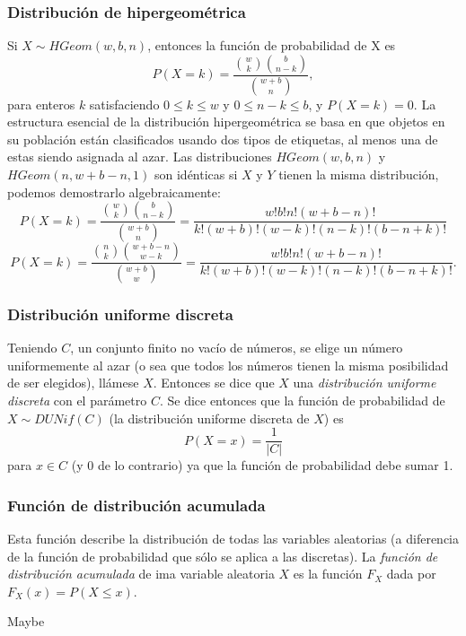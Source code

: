 \documentclass[12pt,letterpaper]{article}
\begin{document}
\subsubsection {Distribución de hipergeométrica}
Si $X \sim HGeom(w,b,n)$, entonces la función de probabilidad de X es
\begin{equation}
P(X=k)=\frac{\binom{w}{k}\binom{b}{n-k}}{\binom{w+b}{n}},
\end{equation}
para enteros $k$ satisfaciendo $0\leq k\leq w$ y $0\leq n-k\leq b$, y $P(X=k)=0$. La estructura esencial de la distribución hipergeométrica se basa en que objetos en su población están clasificados usando dos tipos de etiquetas, al menos una de estas siendo asignada al azar.
Las distribuciones $HGeom(w,b,n)$ y $HGeom(n,w+b-n,1)$ son idénticas si $X$ y $Y$ tienen la misma distribución, podemos demostrarlo algebraicamente:
\begin{equation}
P(X=k)=\frac{\binom{w}{k}\binom{b}{n-k}}{\binom{w+b}{n}}=\frac{w!b!n!(w+b-n)!}{k!(w+b)!(w-k)!(n-k)!(b-n+k)!}
\end{equation}
\begin{equation}
P(X=k)=\frac{\binom{n}{k}\binom{w+b-n}{w-k}}{\binom{w+b}{w}}=\frac{w!b!n!(w+b-n)!}{k!(w+b)!(w-k)!(n-k)!(b-n+k)!}.
\end{equation}%
\subsubsection {Distribución uniforme discreta}
Teniendo $C$, un conjunto finito no vacío de números, se elige un número uniformemente al azar (o sea que todos los números tienen la misma posibilidad de ser elegidos), llámese $X$. Entonces se dice que $X$ una \emph{distribución uniforme discreta} con el parámetro $C$. Se dice entonces que la función de probabilidad de $X \sim DUNif(C)$ (la distribución uniforme discreta de $X$) es
\begin{equation}
P(X=x)=\frac{1}{|C|}
\end{equation}
para $x \in C$ (y $0$ de lo contrario) ya que la función de probabilidad debe sumar 1.
\subsubsection {Función de distribución acumulada}
Esta función describe la distribución de todas las variables aleatorias (a diferencia de la función de probabilidad que sólo se aplica a las discretas). La \emph{función de distribución acumulada} de ima variable aleatoria $X$ es la función $F_X$ dada por $F_X(x)=P(X\leq x)$.



























\newpage
Maybe\cite{blitz19}
\newpage
\printbibliography[heading=bibintoc,title={Fuentes}]
\end{document}
